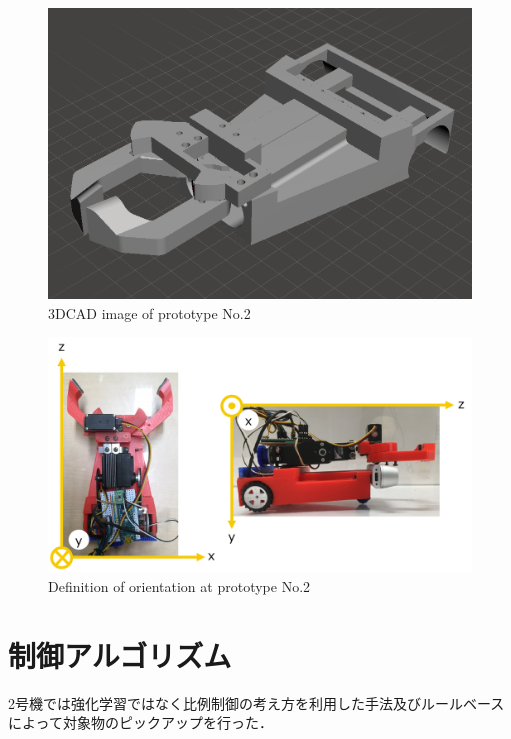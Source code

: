 \begin{figure}
    \centering
    \includegraphics[width=\linewidth]{figure/chapter4/2号機CAD前}
    \caption{3DCAD image of prototype No.2}
    \label{fig:2号機CAD}
\end{figure}

\begin{figure}
    \centering
    \includegraphics[width=0.9\linewidth]{figure/chapter4/2号機向き}
    \caption{Definition of orientation at prototype No.2}
    \label{fig:2号機向き}
\end{figure}


\section{制御アルゴリズム}
2号機では強化学習ではなく比例制御の考え方を利用した手法及びルールベースによって対象物のピックアップを行った．

